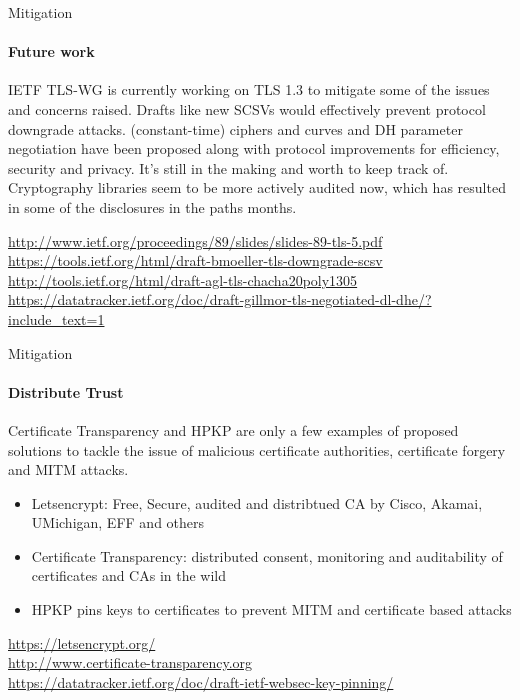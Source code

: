 \documentclass[hyperref={draft}]{beamer}
\begin{document}
\begin{frame}{Mitigation}
  \framesubtitle{Future work}
  IETF TLS-WG is currently working on TLS 1.3 to mitigate some of the issues and concerns raised. 
  \newline
  \newline
  Drafts like new SCSVs would effectively prevent protocol downgrade attacks. (constant-time) ciphers and curves and DH parameter negotiation have been proposed along with protocol improvements for efficiency, security and privacy. It's still in the making and worth to keep track of.
  \newline
  \newline
  Cryptography libraries seem to be more actively audited now, which has resulted in some of the disclosures in the paths months.

  \vspace{15px}

  \tiny
  \url{http://www.ietf.org/proceedings/89/slides/slides-89-tls-5.pdf}\\
  \url{https://tools.ietf.org/html/draft-bmoeller-tls-downgrade-scsv}\\
  \url{http://tools.ietf.org/html/draft-agl-tls-chacha20poly1305}\\
  \url{https://datatracker.ietf.org/doc/draft-gillmor-tls-negotiated-dl-dhe/?include_text=1}\\
\end{frame}

\begin{frame}{Mitigation}
  \framesubtitle{Distribute Trust}
  Certificate Transparency and HPKP are only a few examples of proposed solutions to tackle the issue of malicious certificate authorities, certificate forgery and MITM attacks.

  \begin{itemize}
    \item Letsencrypt: Free, Secure, audited and distribtued CA by Cisco, Akamai, UMichigan, EFF and others
    \item Certificate Transparency: distributed consent, monitoring and auditability of certificates and CAs in the wild
    \item HPKP pins keys to certificates to prevent MITM and certificate based attacks
  \end{itemize}

  \vspace{35px}

  \tiny
  \url{https://letsencrypt.org/}\\
  \url{http://www.certificate-transparency.org}\\
  \url{https://datatracker.ietf.org/doc/draft-ietf-websec-key-pinning/}
\end{frame}
\end{document}
